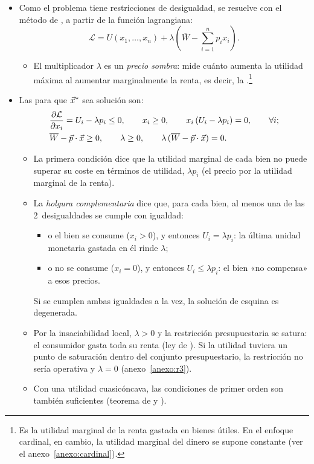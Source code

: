\documentclass[11pt]{article}
\begin{document}
\begin{itemize}
\item Como el problema tiene restricciones de desigualdad, se resuelve con el método de \textcite{KuhnTucker1951Nonlinear}, a partir de la función lagrangiana:
  \begin{equation}
  \mathcal{L}=U(x_1,\dots,x_n)+\lambda\left(\overline{W}-\sum_{i=1}^{n}p_ix_i\right). \label{eq:lagrangiana}
  \end{equation}
  \begin{itemize}
  \item El multiplicador $\lambda$ es un \emph{precio sombra}: mide cuánto aumenta la utilidad máxima al aumentar marginalmente la renta, es decir, la .\footnote{Es la utilidad marginal de la renta gastada en bienes útiles. En el enfoque cardinal, en cambio, la utilidad marginal del dinero se supone constante (ver el anexo~\ref{anexo:cardinal}).}
  \end{itemize}
\item Las  para que $\vec{x}^*$ sea solución son:
  \begin{align}
  &\frac{\partial\mathcal{L}}{\partial x_i}=U_i-\lambda p_i\leq 0,\qquad x_i\geq 0,\qquad x_i\,(U_i-\lambda p_i)=0,\qquad\forall i; \label{eq:kt1}\\
  &\overline{W}-\vec{p}\cdot \vec{x}\geq 0,\qquad \lambda\geq 0,\qquad \lambda\,(\overline{W}-\vec{p}\cdot \vec{x})=0. \label{eq:kt2}
  \end{align}
  \begin{itemize}
  \item La primera condición dice que la utilidad marginal de cada bien no puede superar su coste en términos de utilidad, $\lambda p_i$ (el precio por la utilidad marginal de la renta).
  \item La \emph{holgura complementaria} dice que, para cada bien, al menos una de las 2~desigualdades se cumple con igualdad:
    \begin{itemize}
    \item o el bien se consume ($x_i>0$), y entonces $U_i=\lambda p_i$: la última unidad monetaria gastada en él rinde $\lambda$;
    \item o no se consume ($x_i=0$), y entonces $U_i\leq\lambda p_i$: el bien «no compensa» a esos precios.
    \end{itemize}
    Si se cumplen ambas igualdades a la vez, la solución de esquina es degenerada.
  \item Por la insaciabilidad local, $\lambda>0$ y la restricción presupuestaria se satura: el consumidor gasta toda su renta (ley de ). Si la utilidad tuviera un punto de saturación dentro del conjunto presupuestario, la restricción no sería operativa y $\lambda=0$ (anexo~\ref{anexo:r3}).
  \item Con una utilidad cuasicóncava, las condiciones de primer orden son también suficientes (teorema de  y ).
  \end{itemize}
\end{itemize}
\end{document}
